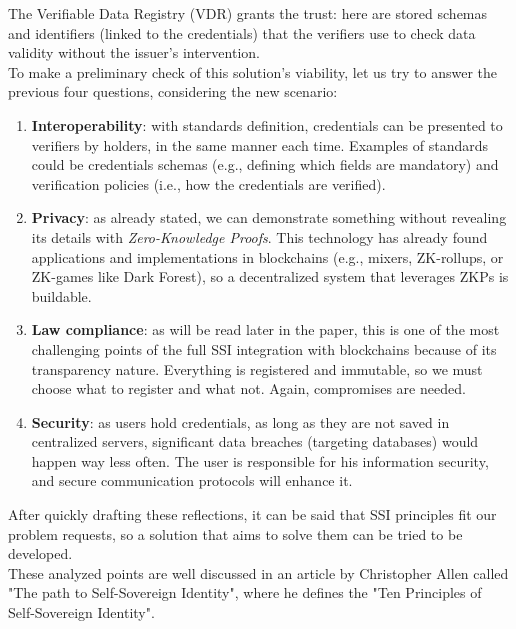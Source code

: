 The Verifiable Data Registry (VDR) grants the trust: here are stored schemas and 
identifiers (linked to the credentials) that the verifiers use to check 
data validity without the issuer's intervention.
\vspace*{0.3cm}\\
To make a preliminary check of this solution's viability, let us try to 
answer the previous four questions, considering the new scenario:
\begin{enumerate}
    \item \textbf{Interoperability}: with standards definition, credentials
    can be presented to verifiers by holders, in the same manner each time. 
    Examples of standards could be credentials schemas (e.g., defining which fields are 
    mandatory) and verification policies (i.e., how the credentials are verified).
    \item \textbf{Privacy}: as already stated, we can demonstrate something
    without revealing its details with \textit{Zero-Knowledge Proofs}. This 
    technology has already found applications and implementations in 
    blockchains (e.g., mixers, ZK-rollups, or ZK-games like Dark Forest), 
    so a decentralized system that leverages ZKPs is buildable.
    \item \textbf{Law compliance}: as will be read later in the paper, 
    this is one of the most challenging points of the full SSI integration 
    with blockchains because of its transparency nature. Everything is 
    registered and immutable, so we must choose what to register and what 
    not. Again, compromises are needed.
    \item \textbf{Security}: as users hold credentials, as long as they are
    not saved in centralized servers, significant data breaches (targeting 
    databases) would happen way less often. The user is responsible for his 
    information security, and secure communication protocols will enhance it.
\end{enumerate}
After quickly drafting these reflections, it can be said that SSI 
principles fit our problem requests, so a solution that aims to solve them 
can be tried to be developed.\\
These analyzed points are well discussed in an article by Christopher Allen 
called "The path to Self-Sovereign Identity", where he defines the "Ten 
Principles of Self-Sovereign Identity".

